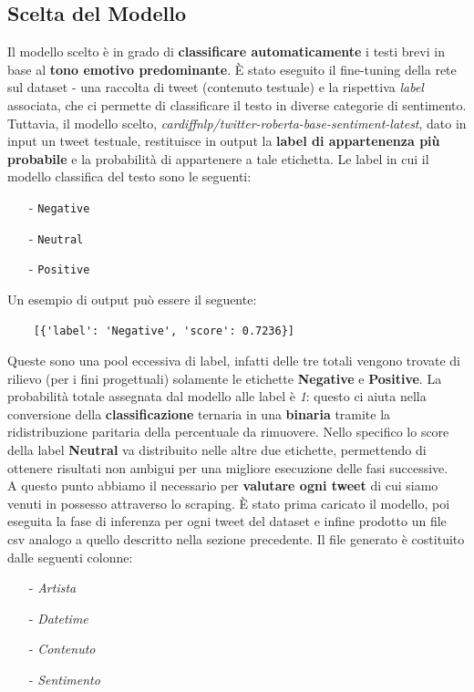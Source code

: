 \documentclass[a4paper,12pt]{article}
\begin{document}
\subsection{Scelta del Modello}
Il modello scelto è in grado di \textbf{classificare automaticamente} i testi brevi in base al \textbf{tono emotivo predominante}. È stato eseguito il fine-tuning della rete sul dataset \cite{barbieri2020tweeteval} - una raccolta di tweet (contenuto testuale) e la rispettiva \textit{label} associata, che ci permette di classificare il testo in diverse categorie di sentimento. Tuttavia, il modello scelto, \textit{cardiffnlp/twitter-roberta-base-sentiment-latest}, dato in input un tweet testuale, restituisce in output la \textbf{label di appartenenza più probabile} e la probabilità di appartenere a tale etichetta. 
Le label in cui il modello classifica del testo sono le seguenti:
\begin{itemize}
    \item[-] \texttt{Negative}
    \item[-] \texttt{Neutral}
    \item[-] \texttt{Positive}
\end{itemize}
Un esempio di output può essere il seguente:
\begin{verbatim}
    [{'label': 'Negative', 'score': 0.7236}]
\end{verbatim}
Queste sono una pool eccessiva di label, infatti delle tre totali vengono trovate di rilievo (per i fini progettuali) solamente le etichette \textbf{Negative} e \textbf{Positive}.
La probabilità totale assegnata dal modello alle label è \textit{1}: questo ci aiuta nella conversione della \textbf{classificazione} ternaria in una \textbf{binaria} tramite la ridistribuzione paritaria della percentuale da rimuovere. Nello specifico lo score della label \textbf{Neutral} va distribuito nelle altre due etichette, permettendo di ottenere risultati non ambigui per una migliore esecuzione delle fasi successive.\\
A questo punto abbiamo il necessario per \textbf{valutare ogni tweet} di cui siamo venuti in possesso attraverso lo scraping. È stato prima caricato il modello, poi eseguita la fase di inferenza per ogni tweet del dataset e infine prodotto un file csv analogo a quello descritto nella sezione precedente. Il file generato è costituito dalle seguenti colonne:
\begin{itemize}
    \item [-] \textit{Artista}
    \item [-] \textit{Datetime}
    \item [-] \textit{Contenuto}
    \item [-] \textit{Sentimento}
\end{itemize}
\end{document}
